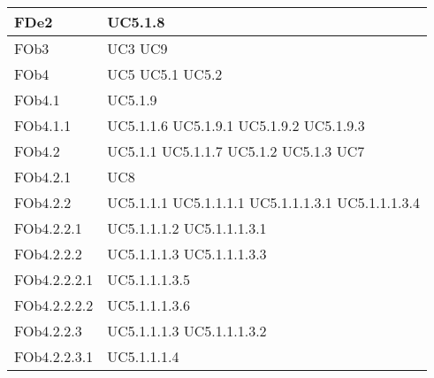 \begin{longtable}{|l|l|}
\hline
FDe2 & UC5.1.8 \linebreak \\ 
\hline
FOb3 & UC3 \linebreak UC9 \linebreak \\ 
\hline
FOb4 & UC5 \linebreak UC5.1 \linebreak UC5.2 \linebreak \\ 
\hline
FOb4.1 & UC5.1.9 \linebreak  \\ 
\hline
FOb4.1.1 & UC5.1.1.6 \linebreak  UC5.1.9.1 \linebreak  UC5.1.9.2 \linebreak  UC5.1.9.3 \linebreak  \\ 
\hline
FOb4.2 & UC5.1.1 \linebreak  UC5.1.1.7 \linebreak  UC5.1.2 \linebreak  UC5.1.3 \linebreak  UC7 \linebreak  \\ 
\hline
FOb4.2.1 & UC8 \linebreak  \\ 
\hline
FOb4.2.2 & UC5.1.1.1 \linebreak  UC5.1.1.1.1 \linebreak  UC5.1.1.1.3.1 \linebreak  UC5.1.1.1.3.4 \linebreak  \\ 
\hline
FOb4.2.2.1 & UC5.1.1.1.2 \linebreak  UC5.1.1.1.3.1 \linebreak  \\ 
\hline
FOb4.2.2.2 & UC5.1.1.1.3 \linebreak  UC5.1.1.1.3.3 \linebreak  \\ 
\hline
FOb4.2.2.2.1 & UC5.1.1.1.3.5 \linebreak  \\ 
\hline
FOb4.2.2.2.2 & UC5.1.1.1.3.6 \linebreak  \\ 
\hline
FOb4.2.2.3 & UC5.1.1.1.3 \linebreak  UC5.1.1.1.3.2 \linebreak  \\ 
\hline
FOb4.2.2.3.1 & UC5.1.1.1.4 \linebreak  \\ 

\end{longtable}
